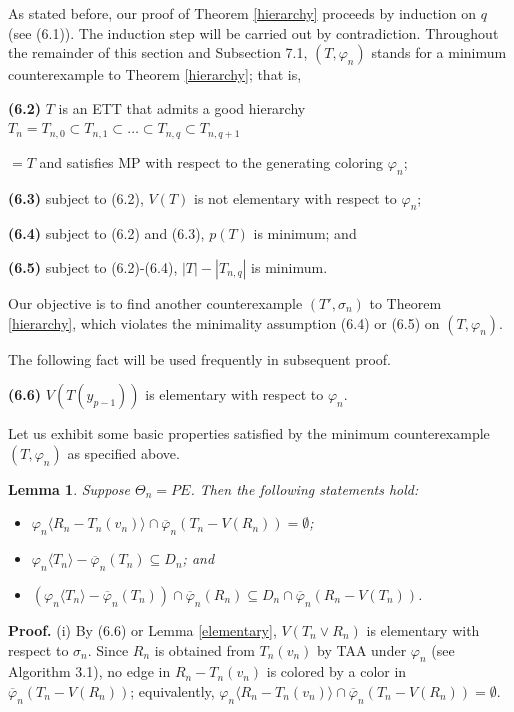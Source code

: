 \documentclass[11pt]{article}
\newtheorem{lemma}[theorem]{Lemma}
\newcommand{\phibar}{\overline{\varphi}}
\begin{document}
As stated before, our proof of Theorem \ref{hierarchy} proceeds by induction on $q$ (see (6.1)). The induction step will be 
carried out by contradiction. Throughout the remainder of this section and Subsection 7.1, $(T, \varphi_n)$ stands for 
a minimum counterexample to Theorem \ref{hierarchy}; that is,

{\bf (6.2)} $T$ is an ETT that admits a good hierarchy $T_n=T_{n,0} \subset T_{n,1} \subset \ldots \subset
T_{n,q} \subset T_{n,q+1}$

\hskip 10mm  $=T$  and satisfies MP with respect to the generating coloring $\varphi_n$;

{\bf (6.3)} subject to (6.2), $V(T)$ is not elementary with respect to $\varphi_n$;

{\bf (6.4)} subject to (6.2) and (6.3), $p(T)$ is minimum; and

{\bf (6.5)} subject to (6.2)-(6.4), $|T|-|T_{n,q}|$ is minimum.

\noindent Our objective is to find another counterexample $(T', \sigma_n)$ to Theorem \ref{hierarchy}, which violates 
the minimality assumption (6.4) or (6.5) on $(T, \varphi_n)$.

The following fact will be used frequently in subsequent proof. 

{\bf (6.6)} $V(T(y_{p-1}))$ is elementary with respect to $\varphi_n$.

\vskip 2mm

Let us exhibit some basic properties satisfied by the minimum counterexample $(T, \varphi_n)$ as specified above. 

\vskip 3mm

\iffalse
\begin{lemma}\label{becare}
Suppose $\Theta_n=PE$. Then the following statements hold:
\begin{itemize}
\vspace{-2mm}
\item[(i)] $\varphi_n \langle R_n-T_n(v_n) \rangle \cap \phibar_n (T_n-V(R_n))=\emptyset$;
\vspace{-2mm}
\item[(ii)] $\varphi_n \langle T_n \rangle-\phibar_n(T_n)\subseteq D_n$; and
\vspace{-2mm}
\item[(iii)] $(\varphi_n \langle T_n \rangle-\phibar_n(T_n))\cap \phibar_n(R_n)\subseteq D_n\cap \phibar_n(R_n-V(T_n))$.
\end{itemize} 
\end{lemma}	

{\bf Proof.} (i) By (6.6) or Lemma \ref{elementary}, $V(T_n\vee R_n)$ is elementary with respect to $\sigma_n$.
Since $R_n$ is obtained from $T_n(v_n)$ by TAA under $\varphi_n$ (see Algorithm 3.1), no edge in $R_n-T_n(v_n)$ is 
colored by a color in $\phibar_n(T_n-V(R_n))$; equivalently,  $\varphi_n \langle R_n-T_n(v_n) \rangle \cap \phibar_n (T_n-V(R_n))=\emptyset$.
\end{document}
